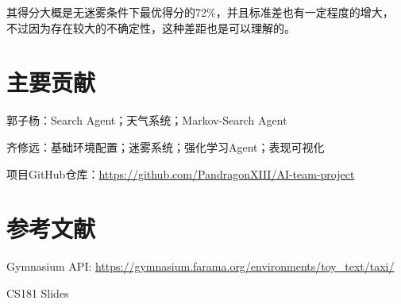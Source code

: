 \documentclass{article}
\begin{document}
\begin{CJK}{UTF8}{gbsn}
其得分大概是无迷雾条件下最优得分的72\%，并且标准差也有一定程度的增大，
不过因为存在较大的不确定性，这种差距也是可以理解的。

\section{主要贡献}
郭子杨：Search Agent；天气系统；Markov-Search Agent 

齐修远：基础环境配置；迷雾系统；强化学习Agent；表现可视化 


项目GitHub仓库：\url{https://github.com/PandragonXIII/AI-team-project} 

\section{参考文献}
Gymnasium API: \url{https://gymnasium.farama.org/environments/toy_text/taxi/} 

CS181 Slides




\end{CJK}
\end{document}

